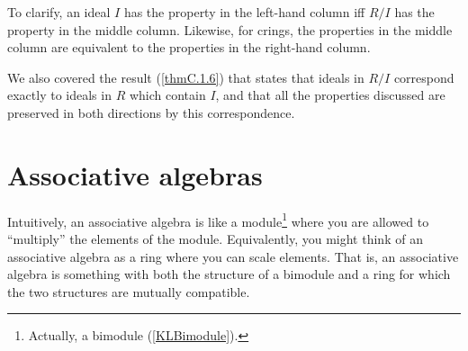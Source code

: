 \noindent
To clarify, an ideal $I$ has the property in the left-hand column iff $R/I$ has the property in the middle column.  Likewise, for crings, the properties in the middle column are equivalent to the properties in the right-hand column.

We also covered the result (\cref{thmC.1.6}) that states that ideals in $R/I$ correspond exactly to ideals in $R$ which contain $I$, and that all the properties discussed are preserved in both directions by this correspondence.

\section{Associative algebras}

Intuitively, an associative algebra is like a module\footnote{Actually, a bimodule (\cref{KLBimodule}).} where you are allowed to ``multiply'' the elements of the module.  Equivalently, you might think of an associative algebra as a ring where you can scale elements.  That is, an associative algebra is something with both the structure of a bimodule and a ring for which the two structures are mutually compatible.
